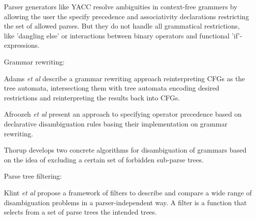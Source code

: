 \begin{isabellebody}
\begin{isamarkuptext}
Parser generators like YACC resolve ambiguities in context-free grammers by allowing the user
the specify precedence and associativity declarations restricting the set of allowed parses. But they
do not handle all grammatical restrictions, like 'dangling else' or interactions between binary operators
and functional 'if'-expressions.

Grammar rewriting:

Adams \textit{et al} \cite{Adams:2017} describe a grammar rewriting approach reinterpreting CFGs as
the tree automata, intersectiong them with tree automata encoding desired restrictions and reinterpreting
the results back into CFGs.

Afroozeh \textit{et al} \cite{Afroozeh:2013} present an approach to specifying operator precedence
based on declarative disambiguation rules basing their implementation on grammar rewriting.

Thorup \cite{Thorup:1996} develops two concrete algorithms for disambiguation of grammars based on the idea of 
excluding a certain set of forbidden sub-parse trees.

Parse tree filtering:

Klint \textit{et al} \cite{Klint:1997} propose a framework of filters to describe and compare a wide
range of disambiguation problems in a parser-independent way. A filter is a function that selects
from a set of parse trees the intended trees.%
\end{isamarkuptext}\isamarkuptrue%
%
\isadelimtheory
%
\endisadelimtheory
%
\isatagtheory
%
\endisatagtheory
{\isafoldtheory}%
%
\isadelimtheory
%
\endisadelimtheory
%
\end{isabellebody}%
\endinput
